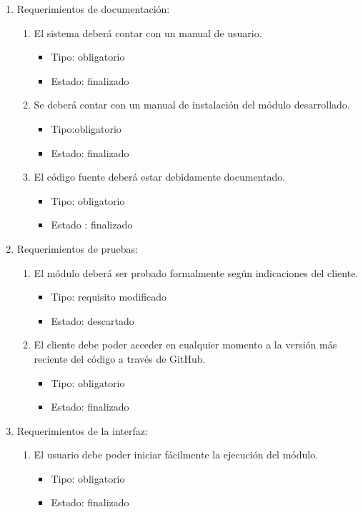 \begin{enumerate}
\item Requerimientos de documentación:
\begin{enumerate}
	\item El sistema deberá contar con un manual de usuario.
	\begin{itemize}
		\item Tipo: obligatorio
		\item Estado: finalizado
	\end{itemize}
	\item Se deberá contar con un manual de instalación del módulo desarrollado.
	\begin{itemize}
	 \item Tipo:obligatorio
	 \item Estado: finalizado
	\end{itemize}
	\item El código fuente deberá estar debidamente documentado.
	\begin{itemize}
		\item Tipo: obligatorio
		\item Estado : finalizado
	\end{itemize}
\end{enumerate}
\item Requerimientos de pruebas:
\begin{enumerate}
	\item El módulo deberá ser probado formalmente según indicaciones del cliente.
	\begin{itemize}
		\item Tipo: requisito modificado
		\item Estado: descartado
	\end{itemize}
	\item El cliente debe poder acceder en cualquier momento a la versión más reciente del código a través de GitHub.
	\begin{itemize}
	 \item Tipo: obligatorio
	 \item Estado: finalizado
	\end{itemize}
\end{enumerate}
\item Requerimientos de la interfaz:
\begin{enumerate}
	\item El usuario debe poder iniciar fácilmente la ejecución del módulo.
	\begin{itemize}
		\item Tipo: obligatorio
		\item Estado: finalizado

\end{itemize}
\end{enumerate}
\end{enumerate}
